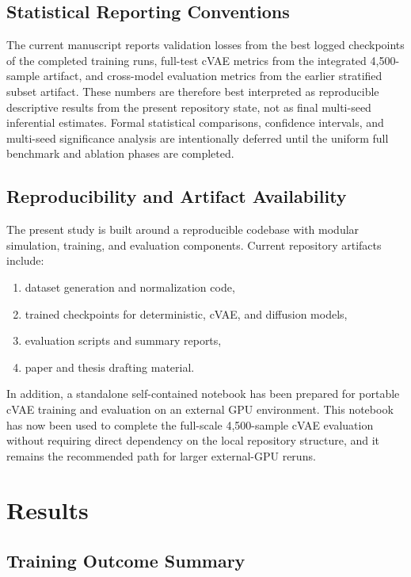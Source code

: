\documentclass[11pt]{article}
\begin{document}
\subsection{Statistical Reporting Conventions}

The current manuscript reports validation losses from the best logged checkpoints of the completed training runs, full-test cVAE metrics from the integrated 4,500-sample artifact, and cross-model evaluation metrics from the earlier stratified subset artifact. These numbers are therefore best interpreted as reproducible descriptive results from the present repository state, not as final multi-seed inferential estimates. Formal statistical comparisons, confidence intervals, and multi-seed significance analysis are intentionally deferred until the uniform full benchmark and ablation phases are completed.

\subsection{Reproducibility and Artifact Availability}

The present study is built around a reproducible codebase with modular simulation, training, and evaluation components. Current repository artifacts include:
\begin{enumerate}[leftmargin=1.5em]
    \item dataset generation and normalization code,
    \item trained checkpoints for deterministic, cVAE, and diffusion models,
    \item evaluation scripts and summary reports,
    \item paper and thesis drafting material.
\end{enumerate}

In addition, a standalone self-contained notebook has been prepared for portable cVAE training and evaluation on an external GPU environment. This notebook has now been used to complete the full-scale 4,500-sample cVAE evaluation without requiring direct dependency on the local repository structure, and it remains the recommended path for larger external-GPU reruns.

\section{Results}

\subsection{Training Outcome Summary}
\end{document}
